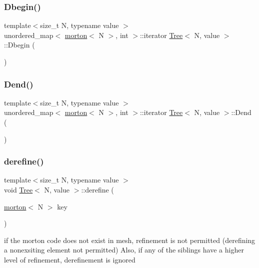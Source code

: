 \subsubsection{\texorpdfstring{Dbegin()}{Dbegin()}}
{\footnotesize\ttfamily template$<$size\+\_\+t N, typename value $>$ \\
unordered\+\_\+map$<$ \mbox{\hyperlink{definitions_8h_af8682350bd8bb38ee9023f7a0a310add}{morton}}$<$ N $>$, int $>$\+::iterator \mbox{\hyperlink{classTree}{Tree}}$<$ N, value $>$\+::Dbegin (\begin{DoxyParamCaption}{ }\end{DoxyParamCaption})}

\mbox{\label{classTree_a89894433bb64a326f411f328890b187a}} 
\subsubsection{\texorpdfstring{Dend()}{Dend()}}
{\footnotesize\ttfamily template$<$size\+\_\+t N, typename value $>$ \\
unordered\+\_\+map$<$ \mbox{\hyperlink{definitions_8h_af8682350bd8bb38ee9023f7a0a310add}{morton}}$<$ N $>$, int $>$\+::iterator \mbox{\hyperlink{classTree}{Tree}}$<$ N, value $>$\+::Dend (\begin{DoxyParamCaption}{ }\end{DoxyParamCaption})}

\mbox{\label{classTree_ab570c49c859bb12ab22f29eb1fb51e0f}} 
\subsubsection{\texorpdfstring{derefine()}{derefine()}}
{\footnotesize\ttfamily template$<$size\+\_\+t N, typename value $>$ \\
void \mbox{\hyperlink{classTree}{Tree}}$<$ N, value $>$\+::derefine (\begin{DoxyParamCaption}\item[{\mbox{\hyperlink{definitions_8h_af8682350bd8bb38ee9023f7a0a310add}{morton}}$<$ N $>$}]{key }\end{DoxyParamCaption})}

if the morton code does not exist in mesh, refinement is not permitted (derefining a nonexsiting element not permitted) Also, if any of the siblings have a higher level of refinement, derefinement is ignored

